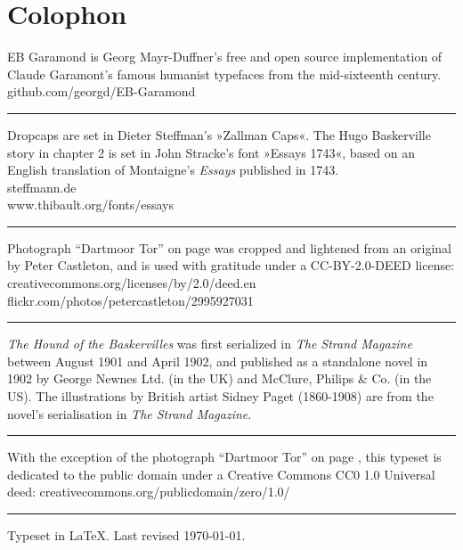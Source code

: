 \documentclass[
paper=5.5in:8.5in,
BCOR=7mm,
twoside,
DIV=calc,
11pt,
usegeometry,
chapterprefix,
endperiod,
headings=big]{scrbook} %
\def\picsize{\textwidth}
\def\picsize{\textwidth}
\begin{document}
%
%
%
%
%

\chapter*{Colophon}

\centering

EB Garamond is Georg Mayr-Duffner's free and open source implementation of Claude Garamont’s famous humanist typefaces from the mid-sixteenth century.\\
github.com/georgd/EB-Garamond
\vfill
\rule{0.5\textwidth}{.4pt}
\vfill
Dropcaps are set in Dieter Steffman's »Zallman Caps«. The Hugo Baskerville story in chapter 2 is set in John Stracke's font »Essays 1743«, based on an English translation of Montaigne's \textit{Essays} published in 1743.\\
steffmann.de\\
www.thibault.org/fonts/essays
\vfill
\rule{0.5\textwidth}{.4pt}
\vfill
Photograph \enquote{Dartmoor Tor} on page \pageref{tor} was cropped and lightened from an original by Peter Castleton, and is used with gratitude under a CC-BY-2.0-DEED license: creativecommons.org/licenses/by/2.0/deed.en\\
flickr.com/photos/petercastleton/2995927031
\vfill
\rule{0.5\textwidth}{.4pt}
\vfill
\textit{The Hound of the Baskervilles} was first serialized in \textit{The Strand Magazine} between August 1901 and April 1902, and published as a standalone novel in 1902 by George Newnes Ltd. (in the UK) and McClure, Philips \& Co. (in the US). The illustrations by British artist Sidney Paget (1860-1908) are from the novel's serialisation in \textit{The Strand Magazine}.
\vfill
\rule{0.5\textwidth}{.4pt}
\vfill
With the exception of the photograph \enquote{Dartmoor Tor} on page \pageref{tor}, this typeset is dedicated to the public domain under a Creative Commons CC0 1.0 Universal deed: creativecommons.org/publicdomain/zero/1.0/
\vfill
\rule{0.5\textwidth}{.4pt}
\vfill
Typeset in \LaTeX{}. Last revised \today.
\thispagestyle{empty}
\end{document}
